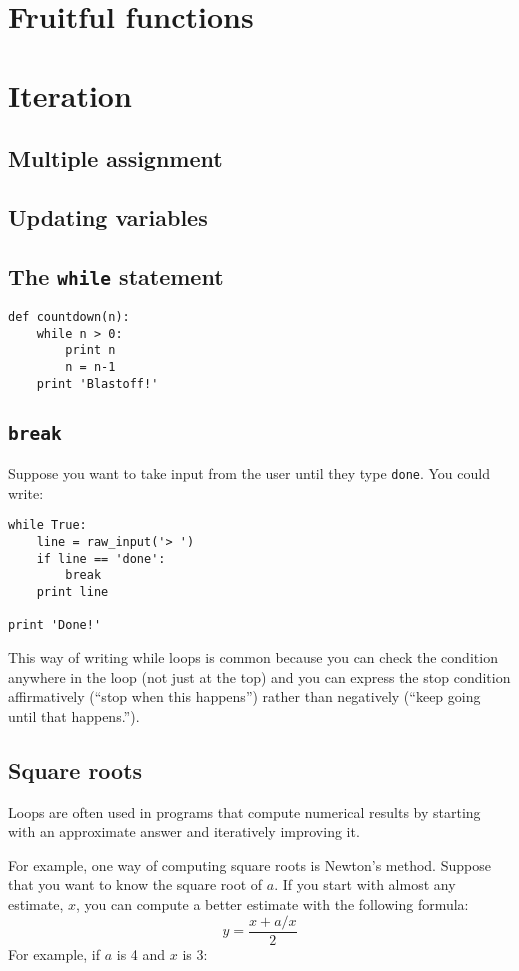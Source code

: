 \documentclass{article}
\begin{document}
\section{Fruitful functions}
\section{Iteration}
\subsection{Multiple assignment}
\subsection{Updating variables}
\subsection{The \texttt{while} statement}
\begin{lstlisting}
def countdown(n):
    while n > 0:
        print n
        n = n-1
    print 'Blastoff!'
\end{lstlisting}

\subsection{\texttt{break}}
Suppose you want to take input from the user until they type \verb|done|.
You could write:
\begin{lstlisting}
while True:
    line = raw_input('> ')
    if line == 'done':
        break
    print line

print 'Done!'
\end{lstlisting}
This way of writing while loops is common because you can check the
condition anywhere in the loop (not just at the top) and you can express
the stop condition affirmatively (``stop when this happens'') rather than
negatively (``keep going until that happens.'').

\subsection{Square roots}
Loops are often used in programs that compute numerical results by starting
with an approximate answer and iteratively improving it.

For example, one way of computing square roots is Newton’s method. Suppose
that you want to know the square root of $a$. If you start with almost any
estimate, $x$, you can compute a better estimate with the following formula:
\[
    y = \frac{x + a/x}{2}
    \]
For example, if $a$ is 4 and $x$ is 3:
\end{document}

